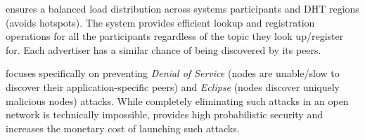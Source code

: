  \sysname ensures a balanced load distribution across systems participants and DHT regions (\ie avoids hotspots). The system provides efficient lookup and registration operations for all the participants regardless of the topic they look up/register for. Each advertiser has a similar chance of being discovered by its peers. 

 \sysname focuses specifically on preventing \emph{Denial of Service} (nodes are unable/slow to discover their application-specific peers) and \emph{Eclipse} (nodes discover uniquely malicious nodes) attacks. While completely eliminating such attacks in an open network is technically impossible, \sysname provides high probabilistic security  and increases the monetary cost of launching such attacks. 
